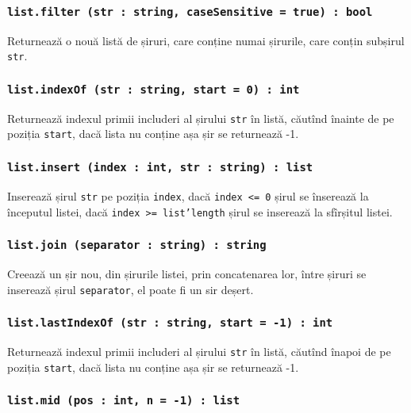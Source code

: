 \subsubsection{\texttt{list.filter (str : string, caseSensitive = true) : bool}}

Returnează o nouă listă de șiruri, care conține numai șirurile, care conțin subșirul \texttt{str}. 

\subsubsection{\texttt{list.indexOf (str : string, start = 0) : int}}

Returnează indexul primii includeri al șirului \texttt{str} în listă, căutînd înainte de pe poziția \texttt{start}, dacă lista nu conține așa șir se returnează -1.

\subsubsection{\texttt{list.insert (index : int, str : string) : list}}

Inserează șirul \texttt{str} pe poziția \texttt{index}, dacă \texttt{index <= 0} șirul se înserează la începutul listei, dacă \texttt{index >= list'length} șirul se inserează la sfîrșitul listei.

\subsubsection{\texttt{list.join (separator : string) : string}}

Creează un șir nou, din șirurile listei, prin concatenarea lor, între șiruri se inserează șirul \texttt{separator}, el poate fi un sir deșert.

\subsubsection{\texttt{list.lastIndexOf (str : string, start = -1) : int}}

Returnează indexul primii includeri al șirului \texttt{str} în listă, căutînd înapoi de pe poziția \texttt{start}, dacă lista nu conține așa șir se returnează -1.

\subsubsection{\texttt{list.mid (pos : int, n = -1) : list}}

